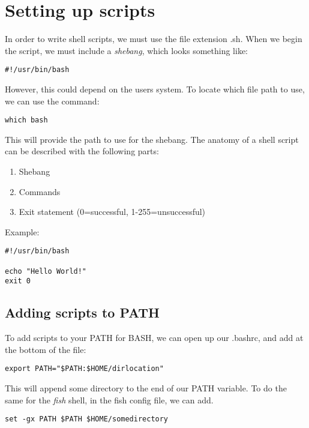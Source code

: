 \documentclass{report}
\begin{document}
    \section{\LARGE Setting up scripts}
    \bigbreak \noindent 
    In order to write shell scripts, we must use the file extension .sh. When we begin the script, we must include a \textit{shebang}, which looks something like:
    \bigbreak \noindent 
    \begin{verbatim}
#!/usr/bin/bash
    \end{verbatim}
    \bigbreak \noindent 
    However, this could depend on the users system. To locate which file path to use, we can use the command:
    \begin{verbatim}
which bash
    \end{verbatim}
    \bigbreak \noindent 
    This will provide the path to use for the shebang.
    \bigbreak \noindent 
    The anatomy of a shell script can be described with the following parts:
    \bigbreak \noindent 
    \begin{enumerate}
        \item Shebang 
        \item Commands
        \item Exit statement (0=successful, 1-255=unsuccessful)
    \end{enumerate}
    \bigbreak \noindent 
    Example:
    \bigbreak \noindent 
    \begin{mdframed}[style=purplebox]
    \begin{verbatim}
#!/usr/bin/bash

echo "Hello World!"
exit 0
    \end{verbatim}
    \bigbreak \noindent 
    \end{mdframed}
    \bigbreak \noindent 

    \bigbreak \noindent 
    \subsection{Adding scripts to PATH}
    \bigbreak \noindent 
    To add scripts to your PATH for BASH, we can open up our .bashrc, and add at the bottom of the file:
    \bigbreak \noindent 
    \begin{mdframed}[style=purplebox]
    \begin{verbatim}
export PATH="$PATH:$HOME/dirlocation"
    \end{verbatim}
    \end{mdframed}
    \bigbreak \noindent 
    This will append some directory to the end of our PATH variable. To do the same for the \textit{fish} shell, in the fish config file, we can add.
    \bigbreak \noindent 
    \begin{mdframed}[style=purplebox]
    \begin{verbatim}
set -gx PATH $PATH $HOME/somedirectory
    \end{verbatim}
    \end{mdframed}
\end{document}
